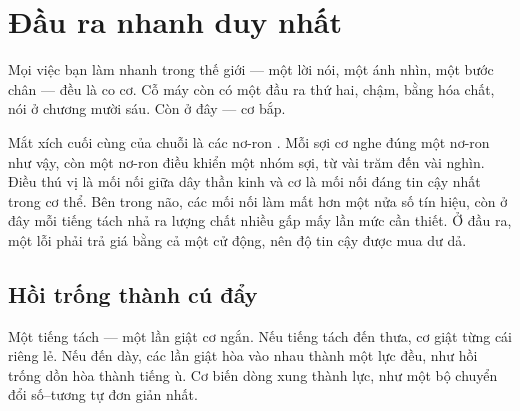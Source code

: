 \chapter{Đầu ra nhanh duy nhất}

Mọi việc bạn làm nhanh trong thế giới --- một lời nói, một ánh nhìn, một bước chân --- đều là co cơ. Cỗ máy còn có một đầu ra thứ hai, chậm, bằng hóa chất, nói ở chương mười sáu. Còn ở đây --- cơ bắp.

Mắt xích cuối cùng của chuỗi là các nơ-ron . Mỗi sợi cơ nghe đúng một nơ-ron như vậy, còn một nơ-ron điều khiển một nhóm sợi, từ vài trăm đến vài nghìn. Điều thú vị là mối nối giữa dây thần kinh và cơ là mối nối đáng tin cậy nhất trong cơ thể. Bên trong não, các mối nối làm mất hơn một nửa số tín hiệu, còn ở đây mỗi tiếng tách nhả ra lượng chất nhiều gấp mấy lần mức cần thiết. Ở đầu ra, một lỗi phải trả giá bằng cả một cử động, nên độ tin cậy được mua dư dả.

\section*{Hồi trống thành cú đẩy}

Một tiếng tách --- một lần giật cơ ngắn. Nếu tiếng tách đến thưa, cơ giật từng cái riêng lẻ. Nếu đến dày, các lần giật hòa vào nhau thành một lực đều, như hồi trống dồn hòa thành tiếng ù. Cơ biến dòng xung thành lực, như một bộ chuyển đổi số--tương tự đơn giản nhất.

